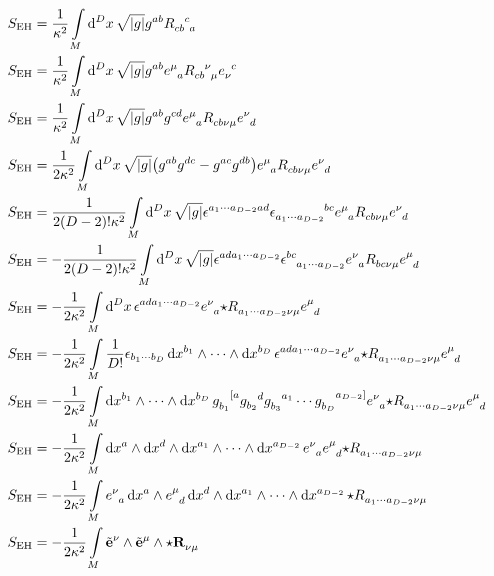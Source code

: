 \begin{align*}
    S_{\textnormal{EH}}&=\frac{1}{\kappa^2}\int\limits_M\dd[D]{x}\sqrt{\abs{g}}g^{ab}\tensor{R}{_c_b^c_a}\\
    S_{\textnormal{EH}}&=\frac{1}{\kappa^2}\int\limits_M\dd[D]{x}\sqrt{\abs{g}}g^{ab}\tensor{e}{^\mu_a}\tensor{R}{_c_b^\nu_\mu}\tensor{e}{_\nu^c}\\
    S_{\textnormal{EH}}&=\frac{1}{\kappa^2}\int\limits_M\dd[D]{x}\sqrt{\abs{g}}g^{ab}g^{cd}\tensor{e}{^\mu_a}\tensor{R}{_c_b_\nu_\mu}\tensor{e}{^\nu_d}\\
    S_{\textnormal{EH}}&=\frac{1}{2\kappa^2}\int\limits_M\dd[D]{x}\sqrt{\abs{g}}\qty(g^{ab}g^{dc}-g^{ac}g^{db})\tensor{e}{^\mu_a}\tensor{R}{_c_b_\nu_\mu}\tensor{e}{^\nu_d}\\
    S_{\textnormal{EH}}&=\frac{1}{2\qty(D-2)!\kappa^2}\int\limits_M\dd[D]{x}\sqrt{\abs{g}}\epsilon^{a_1\cdots a_{D-2}ad}\tensor{\epsilon}{_{a_1\cdots a_{D-2}}^b^c}\tensor{e}{^\mu_a}\tensor{R}{_c_b_\nu_\mu}\tensor{e}{^\nu_d}\\
    S_{\textnormal{EH}}&=-\frac{1}{2\qty(D-2)!\kappa^2}\int\limits_M\dd[D]{x}\sqrt{\abs{g}}\epsilon^{ada_1\cdots a_{D-2}}\tensor{\epsilon}{^b^c_{a_1\cdots a_{D-2}}}\tensor{e}{^\nu_a}\tensor{R}{_b_c_\nu_\mu}\tensor{e}{^\mu_d}\\
    S_{\textnormal{EH}}&=-\frac{1}{2\kappa^2}\int\limits_M\dd[D]{x}\epsilon^{ada_1\cdots a_{D-2}}\tensor{e}{^\nu_a}\tensor{{\star R}}{_{a_1\cdots a_{D-2}}_\nu_\mu}\tensor{e}{^\mu_d}\\
    S_{\textnormal{EH}}&=-\frac{1}{2\kappa^2}\int\limits_M\frac{1}{D!}\epsilon_{b_1\cdots b_D}\dd{x^{b_1}}\wedge\cdots\wedge\dd{x^{b_D}}\epsilon^{ada_1\cdots a_{D-2}}\tensor{e}{^\nu_a}\tensor{{\star R}}{_{a_1\cdots a_{D-2}}_\nu_\mu}\tensor{e}{^\mu_d}\\
    S_{\textnormal{EH}}&=-\frac{1}{2\kappa^2}\int\limits_M\dd{x^{b_1}}\wedge\cdots\wedge\dd{x^{b_D}}\tensor{g}{_{b_1}^{[a}}\tensor{g}{_{b_2}^{d}}\tensor{g}{_{b_3}^{a_1}}\cdots\tensor{g}{_{b_D}^{a_{D-2}]}}\tensor{e}{^\nu_a}\tensor{{\star R}}{_{a_1\cdots a_{D-2}}_\nu_\mu}\tensor{e}{^\mu_d}\\
    S_{\textnormal{EH}}&=-\frac{1}{2\kappa^2}\int\limits_M\dd{x^{a}}\wedge\dd{x^{d}}\wedge\dd{x^{a_1}}\wedge\cdots\wedge\dd{x^{a_{D-2}}}\tensor{e}{^\nu_a}\tensor{e}{^\mu_d}\tensor{{\star R}}{_{a_1\cdots a_{D-2}}_\nu_\mu}\\
    S_{\textnormal{EH}}&=-\frac{1}{2\kappa^2}\int\limits_M\tensor{e}{^\nu_a}\dd{x^{a}}\wedge\tensor{e}{^\mu_d}\dd{x^{d}}\wedge\dd{x^{a_1}}\wedge\cdots\wedge\dd{x^{a_{D-2}}}\tensor{{\star R}}{_{a_1\cdots a_{D-2}}_\nu_\mu}\\
    S_{\textnormal{EH}}&=-\frac{1}{2\kappa^2}\int\limits_M{\tilde{\vb e}^\nu}\wedge{\tilde{\vb e}^\mu}\wedge\tensor{{\star \textbf{R}}}{_\nu_\mu}
\end{align*}















